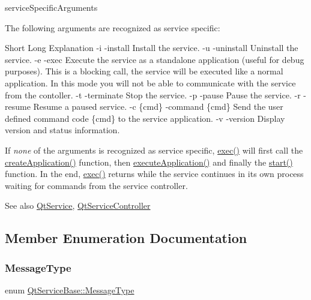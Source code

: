 service\+Specific\+Arguments

The following arguments are recognized as service specific\+:

Short  Long  Explanation   -\/i  -\/install  Install the service.   -\/u  -\/uninstall  Uninstall the service.   -\/e  -\/exec  Execute the service as a standalone application (useful for debug purposes). This is a blocking call, the service will be executed like a normal application. In this mode you will not be able to communicate with the service from the contoller.   -\/t  -\/terminate  Stop the service.   -\/p  -\/pause  Pause the service.   -\/r  -\/resume  Resume a paused service.   -\/c {\itshape }\{cmd\}  -\/command {\itshape }\{cmd\}  Send the user defined command code {\itshape }\{cmd\} to the service application.   -\/v  -\/version  Display version and status information. 

If {\itshape none} of the arguments is recognized as service specific, \hyperlink{class_qt_service_base_afae2e589de71c1ae3ae8db3dc9ab9c64}{exec()} will first call the \hyperlink{class_qt_service_base_ac5ae73935f489282b35c70b27b341390}{create\+Application()} function, then \hyperlink{class_qt_service_base_ab70633cd29a22758dfa0502b77e564f6}{execute\+Application()} and finally the \hyperlink{class_qt_service_base_adbc0cd621b41bd3a6a1f62fda432e9e4}{start()} function. In the end, \hyperlink{class_qt_service_base_afae2e589de71c1ae3ae8db3dc9ab9c64}{exec()} returns while the service continues in its own process waiting for commands from the service controller.

\begin{DoxySeeAlso}{See also}
\hyperlink{class_qt_service}{Qt\+Service}, \hyperlink{class_qt_service_controller}{Qt\+Service\+Controller} 
\end{DoxySeeAlso}


\subsection{Member Enumeration Documentation}
\mbox{\label{class_qt_service_base_acffd9389fe7178bf1f35d8bf3dae1095}} 
\subsubsection{\texorpdfstring{Message\+Type}{MessageType}}
{\footnotesize\ttfamily enum \hyperlink{class_qt_service_base_acffd9389fe7178bf1f35d8bf3dae1095}{Qt\+Service\+Base\+::\+Message\+Type}}

